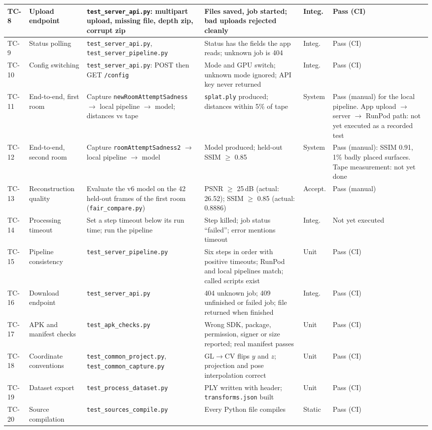 {\begin{longtable}{p{}p{}p{}p{}p{}p{}}
\midrule
TC-8 & Upload endpoint & \texttt{test\_server\_api.py}: multipart upload, missing file, depth zip, corrupt zip & Files saved, job started; bad uploads rejected cleanly & Integ. & Pass (CI) \\
\midrule
TC-9 & Status polling & \texttt{test\_server\_api.py}, \texttt{test\_server\_pipeline.py} & Status has the fields the app reads; unknown job is 404 & Integ. & Pass (CI) \\
\midrule
TC-10 & Config switching & \texttt{test\_server\_api.py}: POST then GET \texttt{/config} & Mode and GPU switch; unknown mode ignored; API key never returned & Integ. & Pass (CI) \\
\midrule
TC-11 & End-to-end, first room & Capture \texttt{newRoomAttemptSadness} $\rightarrow$ local pipeline $\rightarrow$ model; distances vs tape & \texttt{splat.ply} produced; distances within 5\% of tape & System & Pass (manual) for the local pipeline. App upload $\rightarrow$ server $\rightarrow$ RunPod path: not yet executed as a recorded test \\
\midrule
TC-12 & End-to-end, second room & Capture \texttt{roomAttemptSadness2} $\rightarrow$ local pipeline $\rightarrow$ model & Model produced; held-out SSIM $\geq$ 0.85 & System & Pass (manual): SSIM 0.91, 1\% badly placed surfaces. Tape measurement: not yet done \\
\midrule
TC-13 & Reconstruction quality & Evaluate the v6 model on the 42 held-out frames of the first room (\texttt{fair\_compare.py}) & PSNR $\geq$ 25\,dB (actual: 26.52); SSIM $\geq$ 0.85 (actual: 0.8886) & Accept. & Pass (manual) \\
\midrule
TC-14 & Processing timeout & Set a step timeout below its run time; run the pipeline & Step killed; job status ``failed''; error mentions timeout & Integ. & Not yet executed \\
\midrule
TC-15 & Pipeline consistency & \texttt{test\_server\_pipeline.py} & Six steps in order with positive timeouts; RunPod and local pipelines match; called scripts exist & Unit & Pass (CI) \\
\midrule
TC-16 & Download endpoint & \texttt{test\_server\_api.py} & 404 unknown job; 409 unfinished or failed job; file returned when finished & Integ. & Pass (CI) \\
\midrule
TC-17 & APK and manifest checks & \texttt{test\_apk\_checks.py} & Wrong SDK, package, permission, signer or size reported; real manifest passes & Unit & Pass (CI) \\
\midrule
TC-18 & Coordinate conventions & \texttt{test\_common\_project.py}, \texttt{test\_common\_capture.py} & GL$\rightarrow$CV flips $y$ and $z$; projection and pose interpolation correct & Unit & Pass (CI) \\
\midrule
TC-19 & Dataset export & \texttt{test\_process\_dataset.py} & PLY written with header; \texttt{transforms.json} built & Unit & Pass (CI) \\
\midrule
TC-20 & Source compilation & \texttt{test\_sources\_compile.py} & Every Python file compiles & Static & Pass (CI) \\
\bottomrule
\end{longtable}
}
